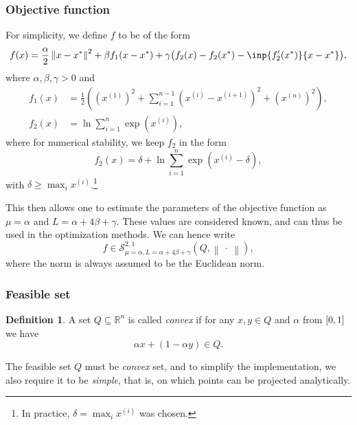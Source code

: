 \documentclass[final]{aomart}
\newtheorem[{}\it]{thm}{Theorem}[section]
\theoremstyle{definition}
\newtheorem{defn}{Definition}[section]
\newtheorem*[{}\it]{notation}{Notation}
\numberwithin{equation}{section}
\newcommand{\interval}[1]{\mathinner{#1}}
\newcommand{\enVert}[1]{\left\lVert#1\right\rVert}
\let\norm=\enVert
\newcommand{\sconvex}{\mathscr{S}}
\begin{document}
\subsubsection{Objective function}
\label{sec:fun}
For simplicity, we define \(f\) to be of the form
\begin{equation}
f(x) = \frac{\alpha}{2} \norm{x - x^*}^2 + \beta f_1 (x - x^*) + \gamma \big(f_2(x) - f_2(x^*) - \inp{f_2'(x^*)}{x - x^*}\big),
\end{equation}
where \(\alpha, \beta, \gamma > 0\) and
\begin{align}
f_1(x) &= \frac{1}{2} \left(\left(x^{(1)}\right)^2 + \sum_{i=1}^{n-1} \left(x^{(i)} - x^{(i+1)}\right)^2 + \left(x^{(n)}\right)^2\right),\\
f_2(x) &= \ln \sum_{i=1}^n \exp\left(x^{(i)}\right),
\end{align}
where for numerical stability, we keep \(f_2\) in the form
\begin{equation}
f_2(x) = \delta + \ln \sum_{i=1}^n \exp\left(x^{(i)} - \delta\right),
\end{equation}
with \(\delta \geqslant \max_i x^{(i)}\).\footnote{In practice, \(\delta = \max_i x^{(i)}\) was chosen.}

This then allows one to estimate the parameters of the objective function as \(\mu= \alpha\) and \(L = \alpha + 4 \beta + \gamma\). These values are considered known, and can thus be used in the optimization methods.
We can hence write
\begin{equation}
f \in \sconvex^{2, 1}_{\mu = \alpha, L = \alpha + 4\beta + \gamma}(Q, \norm{\:\cdot\:}),
\end{equation}
where the norm is always assumed to be the Euclidean norm.

\subsubsection{Feasible set}
\label{sec:sets}
\begin{defn}
	A set \(Q \subseteq \mathbb{R}^n\) is called \emph{convex} if for any \(x, y \in Q\) and \(\alpha\) from \(\interval{[0, 1]}\) we have
	\begin{equation}
	\alpha x + (1 - \alpha y) \in Q.
	\end{equation}
\end{defn}
The feasible set \(Q\) must be \emph{convex} set, and to simplify the implementation, we also require it to be \emph{simple}, that is, on which points can be projected analytically.
\end{document}
